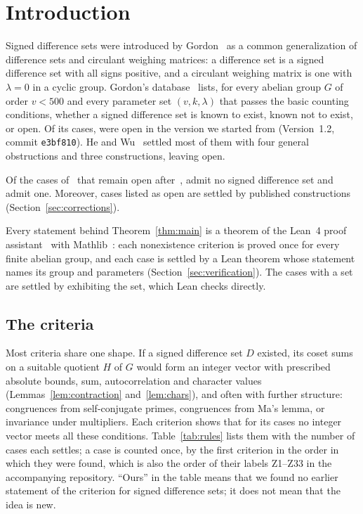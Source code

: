 \section{Introduction}\label{sec:intro}

Signed difference sets were introduced by Gordon~\cite{gordon} as a common generalization of
difference sets and circulant weighing matrices: a difference set is a signed difference set
with all signs positive, and a circulant weighing matrix is one with $\lambda = 0$ in a cyclic
group. Gordon's database~\cite{gordon-db} lists, for every abelian group $G$ of order
$v < 500$ and every parameter set $(v,k,\lambda)$ that passes the basic counting conditions,
whether a signed difference set is known to exist, known not to exist, or open. Of its
\tableRows{} cases, \sourceOpen{} were open in the version we started from (Version~1.2,
commit \texttt{e3bf810}). He and Wu~\cite{he-wu} settled most of them with four general
obstructions and three constructions, leaving \openAfterHeWu{} open.

\begin{theorem}\label{thm:main}
Of the \openAfterHeWu{} cases of~\cite{gordon-db} that remain open after~\cite{he-wu},
\ourNone{} admit no signed difference set and \ourExists{} admit one. Moreover, \corrections{}
cases listed as open are settled by published constructions (Section~\ref{sec:corrections}).
\end{theorem}

Every statement behind Theorem~\ref{thm:main} is a theorem of the Lean~4 proof
assistant~\cite{lean4} with Mathlib~\cite{mathlib}: each nonexistence criterion is proved once
for every finite abelian group, and each case is settled by a Lean theorem whose statement
names its group and parameters (Section~\ref{sec:verification}). The cases with a set are
settled by exhibiting the set, which Lean checks directly.

\subsection*{The criteria}
Most criteria share one shape. If a signed difference set $D$ existed, its coset sums on a
suitable quotient $H$ of $G$ would form an integer vector with prescribed absolute bounds,
sum, autocorrelation and character values (Lemmas~\ref{lem:contraction}
and~\ref{lem:chars}), and often with further structure: congruences from self-conjugate primes,
congruences from Ma's lemma, or invariance under multipliers. Each criterion shows that for
its cases no integer vector meets all these conditions. Table~\ref{tab:rules} lists them with
the number of cases each settles; a case is counted once, by the first criterion in the order
in which they were found, which is also the order of their labels Z1--Z33 in the accompanying
repository. ``Ours'' in the table means that we found no earlier statement of the criterion for
signed difference sets; it does not mean that the idea is new.

